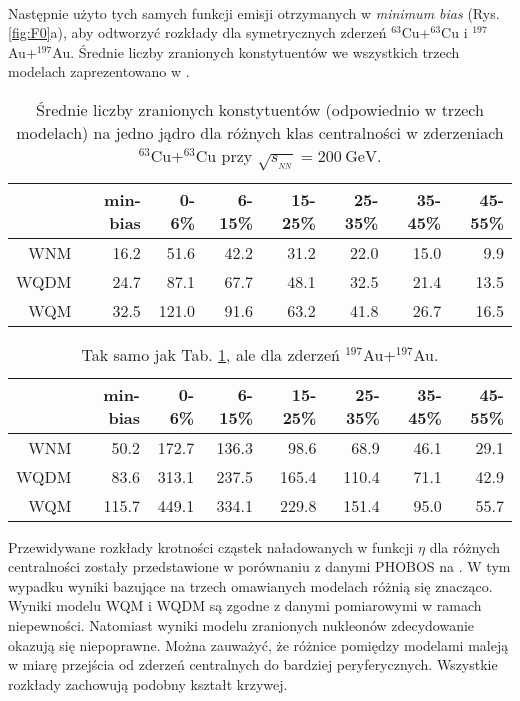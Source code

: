 \documentclass[a4paper,12pt]{article}
\begin{document}
\paragraph{}
Następnie użyto tych samych funkcji emisji otrzymanych w \textit{minimum bias} (Rys. \ref{fig:F0}a), aby odtworzyć rozkłady dla symetrycznych zderzeń $^{63}$Cu+$^{63}$Cu i $^{197}$Au+$^{197}$Au. Średnie liczby zranionych konstytuentów we wszystkich trzech modelach zaprezentowano w .

\begin{table}[H]\centering
\begin{tabular}{|r|r|r|r|r|r|r|r|} \hline
 & min-bias & 0-6\% & 6-15\% & 15-25\% & 25-35\% & 35-45\% & 45-55\% \\ \hline
WNM  & 16.2 & 51.6 & 42.2 & 31.2 & 22.0 & 15.0 & 9.9 \\ \hline
WQDM & 24.7 & 87.1 & 67.7 & 48.1 & 32.5 & 21.4 & 13.5 \\ \hline
WQM  & 32.5 & 121.0 & 91.6 & 63.2 & 41.8 & 26.7 & 16.5 \\ \hline
\end{tabular}
\caption{Średnie liczby zranionych konstytuentów (odpowiednio w trzech modelach) na jedno jądro dla różnych klas centralności w zderzeniach $^{63}$Cu+$^{63}$Cu przy $\sqrt{s_{_{NN}}} = 200~\text{GeV}$.}\label{table:Cu-Cu}
\end{table}
\begin{table}[H]\centering
\begin{tabular}{|r|r|r|r|r|r|r|r|} \hline
 & min-bias & 0-6\% & 6-15\% & 15-25\% & 25-35\% & 35-45\% & 45-55\% \\ \hline
WNM  & 50.2 & 172.7 & 136.3 & 98.6 & 68.9 & 46.1 & 29.1 \\ \hline
WQDM & 83.6 & 313.1 & 237.5 & 165.4 & 110.4 & 71.1 & 42.9 \\ \hline
WQM  & 115.7 & 449.1 & 334.1 & 229.8 & 151.4 & 95.0 & 55.7 \\ \hline
\end{tabular}
\caption{Tak samo jak Tab. \ref{table:Cu-Cu}, ale dla zderzeń $^{197}$Au+$^{197}$Au.}\label{table:Au-Au}
\end{table}

Przewidywane rozkłady krotności cząstek naładowanych w funkcji $\eta$ dla różnych centralności zostały przedstawione w porównaniu z danymi PHOBOS \cite{Alver:2007aa, Back:2002wb} na . W tym wypadku wyniki bazujące na trzech omawianych modelach różnią się znacząco. Wyniki modelu WQM i WQDM są zgodne z danymi pomiarowymi w ramach niepewności. Natomiast wyniki modelu zranionych nukleonów zdecydowanie okazują się niepoprawne. Można zauważyć, że różnice pomiędzy modelami maleją w miarę przejścia od zderzeń centralnych do bardziej peryferycznych. Wszystkie rozkłady zachowują podobny kształt krzywej.
\end{document}
